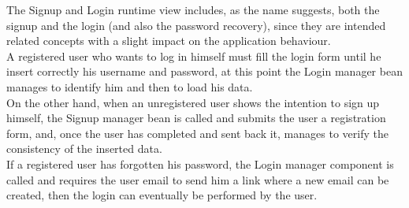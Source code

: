 The Signup and Login runtime view includes, as the name suggests, both the signup and the login (and also the password recovery), since they are intended related concepts with a slight impact on the application behaviour. \\
A registered user who wants to log in himself must fill the login form until he insert correctly his username and password, at this point the Login manager bean manages to identify him and then to load his data. \\
On the other hand, when an unregistered user shows the intention to sign up himself, the Signup manager bean is called and submits the user a registration form, and, once the user has completed and sent back it, manages to verify the consistency of the inserted data. \\ 
If a registered user has forgotten his password, the Login manager component is called and requires the user email to send him a link where a new email can be created, then the login can eventually be performed by the user. \\
